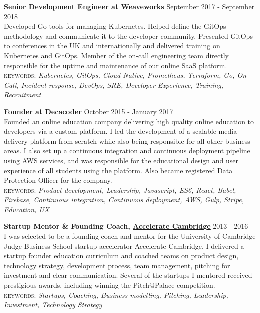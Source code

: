 \documentclass[10pt]{article}
\newcommand{\linkto}[2]{\href{#1}{\color{darkblue}\setulcolor{darkblue}\ul{#2}}}
\newcommand{\blankline}{\quad\pagebreak[2]}
\begin{document}
\blankline

\textbf{Senior Development Engineer at \linkto{https://weave.works}{Weaveworks}} \hfill September 2017 - September 2018\\
Developed Go tools for managing Kubernetes. Helped define the GitOps methodology and communicate it to the developer community. Presented GitOps to conferences in the UK and internationally and delivered training on Kubernetes and GitOps. Member of the on-call engineering team directly responsible for the uptime and maintenance of our online SaaS platform.\\
{\small \textsc{keywords:} \emph{Kubernetes, GitOps, Cloud Native, Prometheus, Terraform, Go, On-Call, Incident response, DevOps, SRE, Developer Experience, Training, Recruitment}}

\blankline


\textbf{Founder at Decacoder} \hfill October 2015 - January 2017\\
Founded an online education company delivering high quality online education to developers via a custom platform. I led the development of a scalable media delivery platform from scratch while also being responsible for all other business areas. I also set up a continuous integration and continuous deployment pipeline using AWS services, and was responsible for the educational design and user experience of all students using the platform. Also became registered Data Protection Officer for the company.\\
{\small \textsc{keywords:} \emph{Product development, Leadership, Javascript, ES6, React, Babel, Firebase, Continuous integration, Continuous deployment, AWS, Gulp, Stripe, Education, UX}}

\blankline

\textbf{Startup Mentor \& Founding Coach, \linkto{https://www.jbs.cam.ac.uk/entrepreneurship/programmes/accelerate-cambridge/programmes/}{Accelerate Cambridge}}  \hfill 2013 - 2016\\
I was selected to be a founding coach and mentor for the University of Cambridge Judge Business School startup accelerator Accelerate Cambridge. I delivered a startup founder education curriculum and coached teams on product design, technology strategy, development process, team management, pitching for investment and clear communication. Several of the startups I mentored received prestigious awards, including winning the Pitch@Palace competition. \\
{\small \textsc{keywords:} \emph{Startups, Coaching, Business modelling, Pitching, Leadership, Investment, Technology Strategy}}
\end{document}
